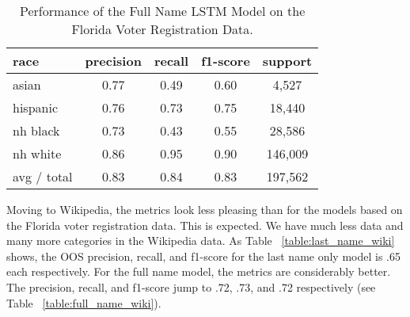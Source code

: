 \documentclass[12pt, letterpaper]{article}
\begin{document}
\begin{table}[h!]
\centering
\caption{Performance of the Full Name LSTM Model on the Florida Voter Registration Data.}
\begin{tabular}{ l c c c c }
\hline    
   race & precision & recall & f1-score & support\\
\hline
      asian &        0.77 &       0.49 &       0.60 &       4,527\\
   hispanic &        0.76 &       0.73 &       0.75 &      18,440\\
   nh black &        0.73 &       0.43 &       0.55 &      28,586\\
   nh white &        0.86 &       0.95 &       0.90 &     146,009\\

avg / total &        0.83 &       0.84 &       0.83 &     197,562\\
\hline
\end{tabular}
\label{table:full_name_fl_voter_reg}
\end{table}

Moving to Wikipedia, the metrics look less pleasing than for the models based on the Florida voter registration data. This is expected. We have much less data and many more categories in the Wikipedia data. As Table ~\ref{table:last_name_wiki} shows, the OOS precision, recall, and f1-score for the last name only model is .65 each respectively. For the full name model, the metrics are considerably better. The precision, recall, and f1-score jump to .72, .73, and .72 respectively (see Table ~\ref{table:full_name_wiki}).
\end{document}
